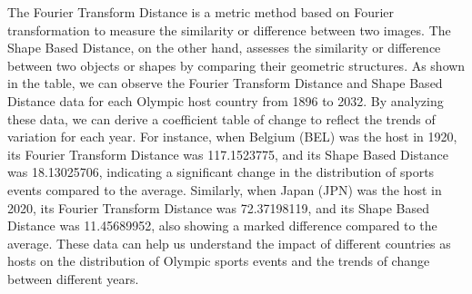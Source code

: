 \documentclass[12pt]{article}
\begin{document}
The Fourier Transform Distance is a metric method based on Fourier transformation to measure the similarity or difference between two images. The Shape Based Distance, on the other hand, assesses the similarity or difference between two objects or shapes by comparing their geometric structures. As shown in the table, we can observe the Fourier Transform Distance and Shape Based Distance data for each Olympic host country from 1896 to 2032. By analyzing these data, we can derive a coefficient table of change to reflect the trends of variation for each year. For instance, when Belgium (BEL) was the host in 1920, its Fourier Transform Distance was 117.1523775, and its Shape Based Distance was 18.13025706, indicating a significant change in the distribution of sports events compared to the average. Similarly, when Japan (JPN) was the host in 2020, its Fourier Transform Distance was 72.37198119, and its Shape Based Distance was 11.45689952, also showing a marked difference compared to the average. These data can help us understand the impact of different countries as hosts on the distribution of Olympic sports events and the trends of change between different years.
\end{document}
